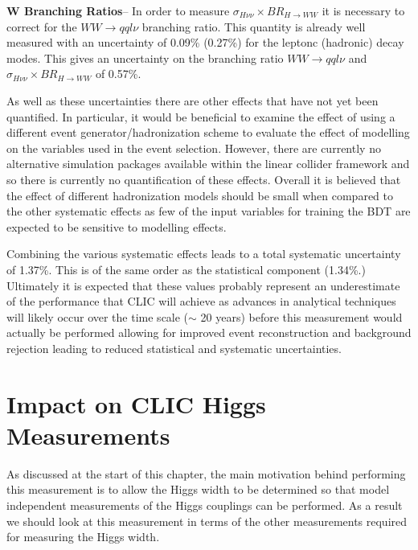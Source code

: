 \textbf{W Branching Ratios}-- In order to measure $\sigma_{H\nu\nu}\times BR_{H\rightarrow WW}$ it is necessary to correct for the $WW\rightarrow qql\nu$ branching ratio. This quantity is already well measured\cite{PDBook} with an uncertainty of 0.09\% (0.27\%) for the leptonc (hadronic) decay modes. This gives an uncertainty on the branching ratio $WW\rightarrow qql\nu$ and $\sigma_{H\nu\nu}\times BR_{H\rightarrow WW}$ of 0.57\%.

As well as these uncertainties there are other effects that have not yet been quantified. In particular, it would be beneficial to examine the effect of using a different event generator/hadronization scheme to evaluate the effect of modelling on the variables used in the event selection. However, there are currently no alternative simulation packages available within the linear collider framework and so there is currently no quantification of these effects. Overall it is believed that the effect of different hadronization models should be small when compared to the other systematic effects as few of the input variables for training the BDT are expected to be sensitive to modelling effects.

Combining the various systematic effects leads to a total systematic uncertainty of 1.37\%. This is of the same order as the statistical component (1.34\%.) Ultimately it is expected that these values probably represent an underestimate of the performance that \ac{CLIC} will achieve as advances in analytical techniques will likely occur over the time scale ($\sim$ 20 years) before this measurement would actually be performed allowing for improved event reconstruction and background rejection leading to reduced statistical and systematic uncertainties.  

\section{Impact on CLIC Higgs Measurements}
As discussed at the start of this chapter, the main motivation behind performing this measurement is to allow the Higgs width to be determined so that model independent measurements of the Higgs couplings can be performed. As a result we should look at this measurement in terms of the other measurements required for measuring the Higgs width.

